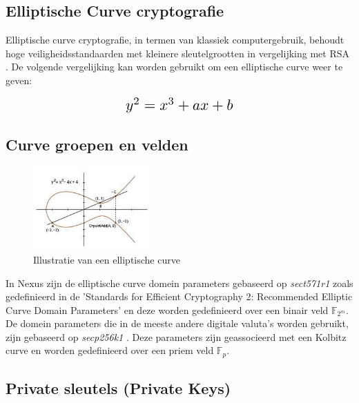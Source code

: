 \documentclass[11pt]{article}
\begin{document}
\subsection{Elliptische Curve cryptografie}

Elliptische curve cryptografie, in termen van klassiek computergebruik, behoudt hoge veiligheidsstandaarden met kleinere sleutelgrootten in vergelijking met RSA \cite{wikikeysize}.
De volgende vergelijking kan worden gebruikt om een ​​elliptische curve weer te geven:

\begin{equation}
\resizebox{.33\hsize}{!}{$y^2 = x^3 + ax + b$}
\end{equation}

\pagebreak
\subsection{Curve groepen en velden}


\begin{figure} %
\vspace{-40pt}
\caption{Illustratie van een elliptische curve}
    \centering
    \includegraphics[width=0.40\textwidth]{ecc.JPG}
\end{figure}

In Nexus zijn de elliptische curve domein parameters gebaseerd op \textit{sect571r1} \cite{sect571r1}zoals gedefinieerd in de 'Standards for Efficient Cryptography 2: Recommended Elliptic Curve Domain Parameters' en deze worden gedefinieerd over een binair veld $\mathbb{F}_{2^m}$.
De domein parameters die in de meeste andere digitale valuta's worden gebruikt, zijn gebaseerd op \textit{secp256k1} \cite{secp256k1}. Deze parameters zijn geassocieerd met een Kolbitz curve en worden gedefinieerd over een priem veld  $\mathbb{F}_p$.

\subsection{Private sleutels (Private Keys)}
\end{document}
